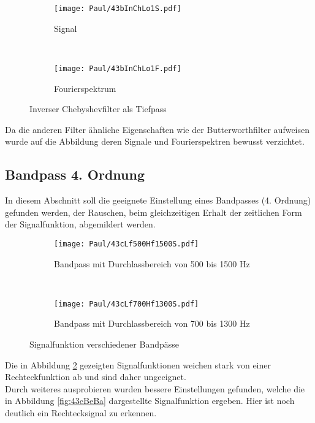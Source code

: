 \begin{figure}[h]
    \centering
    \begin{subfigure}{0.9\textwidth}
        \centering
        \texttt{[image: Paul/43bInChLo1S.pdf]}
        \caption{Signal}
    \end{subfigure}
    \\
    \begin{subfigure}{0.9\textwidth}
        \centering
        \texttt{[image: Paul/43bInChLo1F.pdf]}
        \caption{Fourierspektrum}
    \end{subfigure}
    \caption{Inverser Chebyshevfilter als Tiefpass}
    \label{fig:43bInChLo1}
\end{figure}

Da die anderen Filter ähnliche Eigenschaften wie der Butterworthfilter aufweisen wurde auf die Abbildung deren Signale und Fourierspektren bewusst verzichtet.\\

\newpage
\subsection{Bandpass 4. Ordnung}

In diesem Abschnitt soll die geeignete Einstellung eines Bandpasses (4. Ordnung) gefunden werden, der Rauschen, beim gleichzeitigen Erhalt der zeitlichen Form der Signalfunktion, abgemildert werden.
\begin{figure}[h]
    \centering
    \begin{subfigure}{0.9\textwidth}
        \centering
        \texttt{[image: Paul/43cLf500Hf1500S.pdf]}
        \caption{Bandpass mit Durchlassbereich von 500 bis 1500 Hz}
    \end{subfigure}
    \\
    \begin{subfigure}{0.9\textwidth}
        \centering
        \texttt{[image: Paul/43cLf700Hf1300S.pdf]}
        \caption{Bandpass mit Durchlassbereich von 700 bis 1300 Hz}
    \end{subfigure}
    \caption{Signalfunktion verschiedener Bandpässe}
    \label{fig:43cverBa}
\end{figure}

Die in Abbildung \ref{fig:43cverBa} gezeigten Signalfunktionen weichen stark von einer Rechteckfunktion ab und sind daher ungeeignet.\\
Durch weiteres ausprobieren wurden bessere Einstellungen gefunden, welche die in Abbildung \ref{fig:43cBeBa} dargestellte Signalfunktion ergeben. Hier ist noch deutlich ein Rechtecksignal zu erkennen.\\

